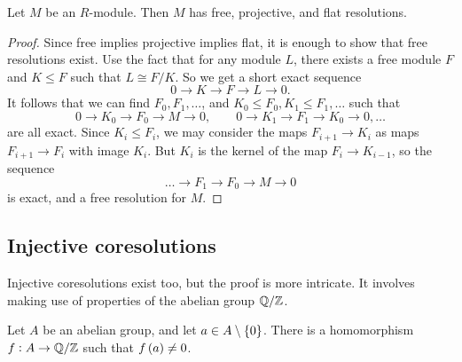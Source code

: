 \begin{proposition}
Let $ M $ be an $ R $-module. Then $ M $ has free, projective, and flat resolutions.
\end{proposition}

\begin{proof}
Since free implies projective implies flat, it is enough to show that free resolutions exist. Use the fact that for any module $ L $, there exists a free module $ F $ and $ K \le F $ such that $ L \cong F / K $. So we get a short exact sequence
$$ 0 \to K \to F \to L \to 0. $$
It follows that we can find $ F_0, F_1, \dots $, and $ K_0 \le F_0, K_1 \le F_1, \dots $ such that
$$ 0 \to K_0 \to F_0 \to M \to 0, \qquad 0 \to K_1 \to F_1 \to K_0 \to 0, \dots $$
are all exact. Since $ K_i \le F_i $, we may consider the maps $ F_{i + 1} \to K_i $ as maps $ F_{i + 1} \to F_i $ with image $ K_i $. But $ K_i $ is the kernel of the map $ F_i \to K_{i - 1} $, so the sequence
$$ \dots \to F_1 \to F_0 \to M \to 0 $$
is exact, and a free resolution for $ M $.
\end{proof}

\subsection{Injective coresolutions}

Injective coresolutions exist too, but the proof is more intricate. It involves making use of properties of the abelian group $ \mathbb{Q} / \mathbb{Z} $.

\begin{proposition}
Let $ A $ be an abelian group, and let $ a \in A \setminus \cbr{0} $. There is a homomorphism $ f : A \to \mathbb{Q} / \mathbb{Z} $ such that $ f\br{a} \ne 0 $. %
\end{proposition}

